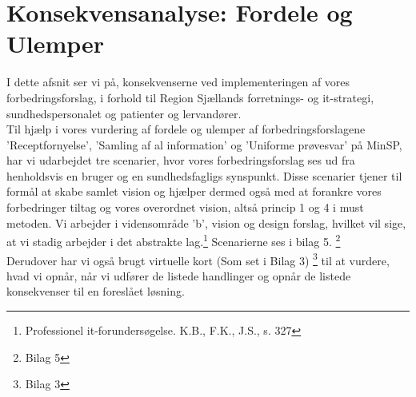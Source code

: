 %
%
%
%
%
%
%
%
%
%
%
%
%
%
%
%
%
%
%
%
%
%
%
%
%
%
%
%
%
%
%
\section{Konsekvensanalyse: Fordele og Ulemper}
I dette afsnit ser vi på, konsekvenserne ved implementeringen af vores forbedringsforslag, i forhold til Region Sjællands forretnings- og it-strategi, sundhedspersonalet og patienter og lervandører.\\
Til hjælp i vores vurdering af fordele og ulemper af forbedringsforslagene 'Receptfornyelse', 'Samling af al information' og 'Uniforme prøvesvar' på MinSP, har vi udarbejdet tre scenarier, hvor vores forbedringsforslag ses ud fra henholdsvis en bruger og en sundhedsfagligs synspunkt. Disse scenarier tjener til formål at skabe samlet vision og hjælper dermed også med at forankre vores forbedringer tiltag og vores overordnet vision, altså princip 1 og 4 i must metoden. Vi arbejder i vidensområde 'b', vision og design forslag, hvilket vil sige, at vi stadig arbejder i det abstrakte lag.\footnote{Professionel it-forundersøgelse. K.B., F.K., J.S., s. 327} Scenarierne ses i bilag 5. \footnote{Bilag 5} \\
Derudover har vi også brugt virtuelle kort (Som set i Bilag 3) \footnote{Bilag 3} til at vurdere, hvad vi opnår, når vi udfører de listede handlinger og opnår de listede konsekvenser til en foreslået løsning.
